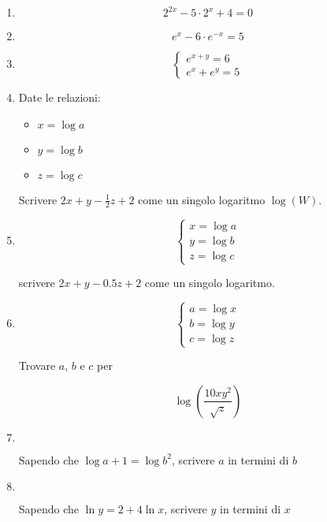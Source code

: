 \begin{enumerate}
\item
\[
2^{2x}-5 \cdot 2^x + 4 = 0
\]

\item
\[
e^x-6\cdot e^{-x}=5
\]

\item
\[
\left\{
\begin{array}{ll}
e^{x+y}=6\\
e^x+e^y=5
\end{array}
\right.
\]

\item 

Date le relazioni:

\begin{itemize}
\item $x = \log a$
\item $y = \log b$
\item $z = \log c$
\end{itemize}

Scrivere $2x+y-\frac{1}{2}z+2$ come un singolo logaritmo $\log(W)$.


\item

\[
\left\{
\begin{array}{ll}
x = \log a \\
y = \log b \\
z = \log c
\end{array}
\right.
\]

scrivere $2x + y - 0.5z + 2$ come un singolo logaritmo.

\item 

\[
\left\{
\begin{array}{ll}
a = \log x \\
b = \log y \\
c = \log z
\end{array}
\right.
\]

Trovare $a$, $b$ e $c$ per

\[
\log\left(
\frac{
10xy^2
}{
\sqrt{z}
}
\right)
\]

\item $ $

Sapendo che $\log a + 1 = \log b^2$, scrivere $a$ in termini di $b$

\item $ $

Sapendo che $\ln y = 2 + 4 \ln x$, scrivere $y$ in termini di $x$


\end{enumerate}
